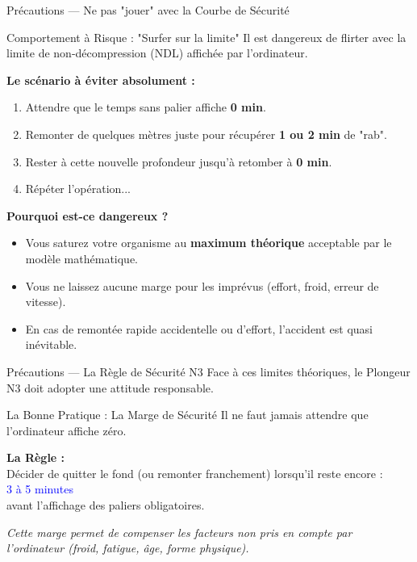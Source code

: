 \begin{frame}{Précautions — Ne pas "jouer" avec la Courbe de Sécurité}
    \begin{alertblock}{Comportement à Risque : "Surfer sur la limite"}
        Il est dangereux de flirter avec la limite de non-décompression (NDL) affichée par l'ordinateur.
        
        \vspace{0.5em}
        \textbf{Le scénario à éviter absolument :}
        \begin{enumerate}
            \item Attendre que le temps sans palier affiche \textbf{0 min}.
            \item Remonter de quelques mètres juste pour récupérer \textbf{1 ou 2 min} de "rab".
            \item Rester à cette nouvelle profondeur jusqu'à retomber à \textbf{0 min}.
            \item Répéter l'opération...
        \end{enumerate}
    \end{alertblock}

    \textbf{Pourquoi est-ce dangereux ?}
    \begin{itemize}
        \item Vous saturez votre organisme au \textbf{maximum théorique} acceptable par le modèle mathématique.
        \item Vous ne laissez aucune marge pour les imprévus (effort, froid, erreur de vitesse).
        \item En cas de remontée rapide accidentelle ou d'effort, l'accident est quasi inévitable.
    \end{itemize}
\end{frame}

\begin{frame}{Précautions — La Règle de Sécurité N3}
    Face à ces limites théoriques, le Plongeur N3 doit adopter une attitude responsable.

    \vspace{0.5cm}

    \begin{exampleblock}{La Bonne Pratique : La Marge de Sécurité}
        Il ne faut jamais attendre que l'ordinateur affiche zéro.
        
        \vspace{0.3cm}
        \centering
        \textbf{La Règle :} \\
        Décider de quitter le fond (ou remonter franchement) lorsqu'il reste encore : \\
        \huge \textcolor{blue}{3 à 5 minutes} \\
        \normalsize avant l'affichage des paliers obligatoires.
    \end{exampleblock}

    \vspace{0.5cm}
    \small
    \textit{Cette marge permet de compenser les facteurs non pris en compte par l'ordinateur (froid, fatigue, âge, forme physique).}
\end{frame}

